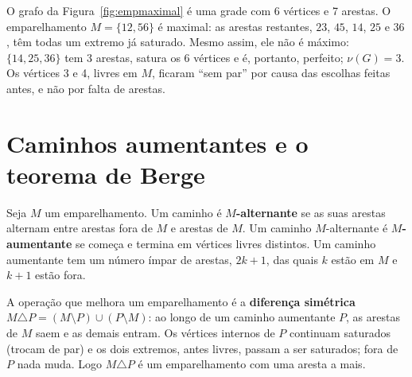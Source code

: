 \begin{exemplo}\label{ex:empmaximal}
O grafo da Figura~\ref{fig:empmaximal} é uma grade com 6 vértices e 7 arestas. O emparelhamento $M=\{12,56\}$ é maximal: as arestas restantes, $23$, $45$, $14$, $25$ e $36$, têm todas um extremo já saturado. Mesmo assim, ele não é máximo: $\{14,25,36\}$ tem 3 arestas, satura os 6 vértices e é, portanto, perfeito; $\nu(G)=3$. Os vértices 3 e 4, livres em $M$, ficaram ``sem par'' por causa das escolhas feitas antes, e não por falta de arestas.
\begin{figura}
\end{figura}
\end{exemplo}

\section{Caminhos aumentantes e o teorema de Berge}\label{sec:aumentante}
Seja $M$ um emparelhamento. Um caminho é \textbf{$M$-alternante} se as suas arestas alternam entre arestas fora de $M$ e arestas de $M$. Um caminho $M$-alternante é \textbf{$M$-aumentante} se começa e termina em vértices livres distintos. Um caminho aumentante tem um número ímpar de arestas, $2k+1$, das quais $k$ estão em $M$ e $k+1$ estão fora.

A operação que melhora um emparelhamento é a \textbf{diferença simétrica} $M\triangle P=(M\setminus P)\cup(P\setminus M)$: ao longo de um caminho aumentante $P$, as arestas de $M$ saem e as demais entram. Os vértices internos de $P$ continuam saturados (trocam de par) e os dois extremos, antes livres, passam a ser saturados; fora de $P$ nada muda. Logo $M\triangle P$ é um emparelhamento com uma aresta a mais.

